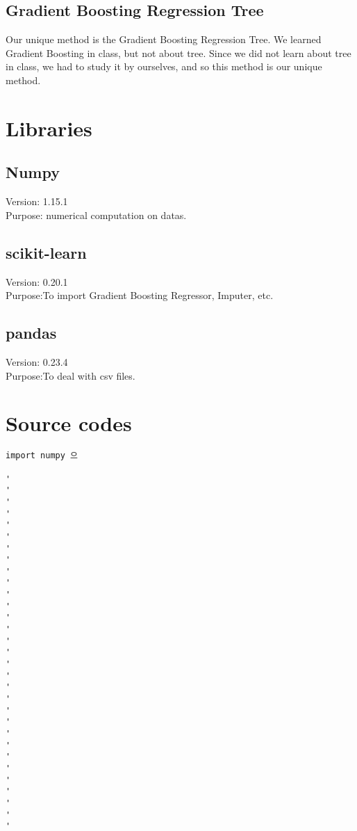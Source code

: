 \documentclass{article}
\begin{document}
\subsection{Gradient Boosting Regression Tree}
Our unique method is the Gradient Boosting Regression Tree. We learned Gradient Boosting in class, but not about tree. Since we did not learn about tree in class, we had to study it by ourselves, and so this method is our unique method.
\section{Libraries}
\subsection{Numpy}
\noindent
Version: 1.15.1 \\
Purpose: numerical computation on datas.

\subsection{scikit-learn}
\noindent
Version: 0.20.1\\
Purpose:To import Gradient Boosting Regressor, Imputer, etc.

\subsection{pandas}
\noindent
Version: 0.23.4\\
Purpose:To deal with csv files.

\section{Source codes}
\begin{lstlisting}
import numpy 으

'
'
'
'
'
'
'
'
'
'
'
'
'
'
'
'
'
'
'
'
'
'
'
'
'
'
'
'
'
'
'


\end{lstlisting}

\end{document}
